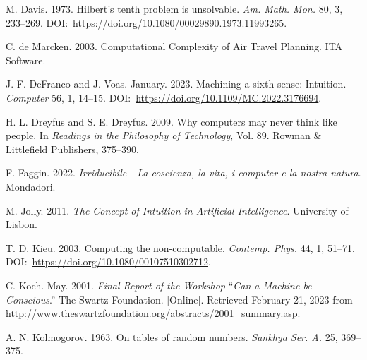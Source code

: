 \begin{thebibliography}{}
 M. Davis. 1973. Hilbert's tenth problem is unsolvable. \textit{Am. Math. Mon.} 80, 3, 233--269. DOI:~\href{https://doi.org/10.1080/00029890.1973.11993265}{https://{\allowbreak}doi.{\allowbreak}org/{\allowbreak}10.{\allowbreak}1080/{\allowbreak}00029890.{\allowbreak}1973.{\allowbreak}11993265}.

 C. de Marcken. 2003. Computational Complexity of Air Travel Planning. ITA Software.

 J. F. DeFranco and J. Voas. January. 2023. Machining a sixth sense: Intuition. \textit{Computer} 56, 1, 14--15. DOI:~\href{https://doi.org/10.1109/MC.2022.3176694}{https://{\allowbreak}doi.{\allowbreak}org/{\allowbreak}10.{\allowbreak}1109/{\allowbreak}MC.{\allowbreak}2022.{\allowbreak}3176694}.

 H. L. Dreyfus and S. E. Dreyfus. 2009. Why computers may never think like people. In \textit{Readings in the Philosophy of Technology}, Vol. 89. Rowman \& Littlefield Publishers, 375--390.

 F. Faggin. 2022. \textit{Irriducibile - La coscienza, la vita, i computer e la nostra natura}. Mondadori.

 M. Jolly. 2011. \textit{The Concept of Intuition in Artificial Intelligence}. University of Lisbon.

 T. D. Kieu. 2003. Computing the non-computable. \textit{Contemp. Phys.} 44, 1, 51--71. DOI:~\href{https://doi.org/10.1080/00107510302712}{https://{\allowbreak}doi.{\allowbreak}org/{\allowbreak}10.{\allowbreak}1080/{\allowbreak}00107510302712}.

 C. Koch. May. 2001. \textit{Final Report of the Workshop} ``\textit{Can a Machine be Conscious}.'' The Swartz Foundation. [Online]. Retrieved February 21, 2023 from \href{http://www.theswartzfoundation.org/abstracts/2001\_summary.asp}{http://www.the{\allowbreak}swartz{\allowbreak}foundation.org/{\allowbreak}abstracts/{\allowbreak}2001\_{\allowbreak}summary.asp}.

 A. N. Kolmogorov. 1963. On tables of random numbers. \textit{Sankhy\={a} Ser. A.} 25, 369--375.


\end{thebibliography}
